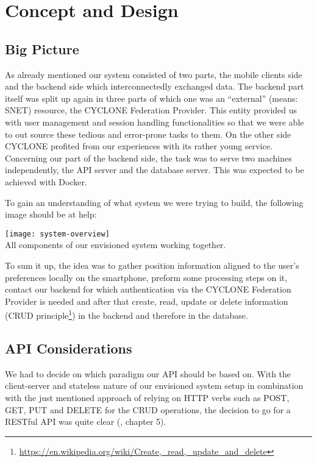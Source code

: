 \chapter{Concept and Design}
\label{cha:conceptanddesign}


\section{Big Picture}

As already mentioned our system consisted of two parts, the mobile clients side and the backend side which interconnectedly exchanged data. The backend part itself was split up again in three parts of which one was an \enquote{external} (means: SNET) resource, the CYCLONE Federation Provider. This entity provided us with user management and session handling functionalities so that we were able to out source these tedious and error-prone tasks to them. On the other side CYCLONE profited from our experiences with its rather young service. Concerning our part of the backend side, the task was to serve two machines independently, the API server and the database server. This was expected to be achieved with Docker.

To gain an understanding of what system we were trying to build, the following image should be at help:

\begin{center}
    \texttt{[image: system-overview]}\\
    All components of our envisioned system working together.
    \label{fig:system-overview}
\end{center}

To sum it up, the idea was to gather position information aligned to the user's preferences locally on the smartphone, preform some processing steps on it, contact our backend for which authentication via the CYCLONE Federation Provider is needed and after that create, read, update or delete information (CRUD principle\footnote{\url{https://en.wikipedia.org/wiki/Create,_read,_update_and_delete}}) in the backend and therefore in the database.


\vspace{0.5cm}

\section{API Considerations}

We had to decide on which paradigm our API should be based on. With the client-server and stateless nature of our envisioned system setup in combination with the just mentioned approach of relying on HTTP verbs such as POST, GET, PUT and DELETE for the CRUD operations, the decision to go for a RESTful API was quite clear (\cite{fielding2000architectural}, chapter 5).

